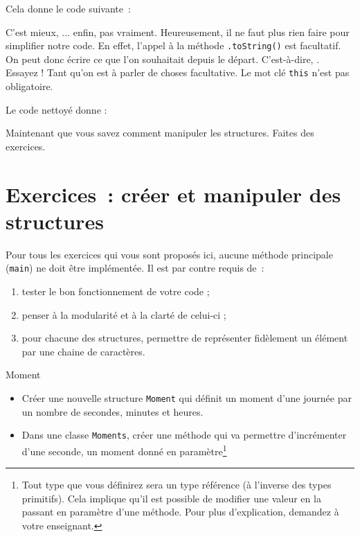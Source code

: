 \documentclass[a4paper,11pt]{article}
\begin{document}
	Cela donne le code suivante~:


	C'est mieux, ... enfin, pas vraiment. Heureusement, il ne faut plus rien faire pour simplifier notre code. En effet, l'appel à la méthode \texttt{.toString()} est facultatif. On peut donc écrire ce que l'on souhaitait depuis le départ. C'est-à-dire, . Essayez ! Tant qu'on est à parler de choses facultative. Le mot clé \texttt{this} n'est pas obligatoire.

	Le code nettoyé donne :

	Maintenant que vous savez comment manipuler les \og structures\fg. Faites des exercices.


	\bigskip

\section{Exercices~: créer et manipuler des structures}
	
	Pour tous les exercices qui vous sont proposés ici, aucune méthode principale (\texttt{main}) ne doit être implémentée. Il est par contre requis de~:
	\begin{enumerate}
		\item tester le bon fonctionnement de votre code ;
		\item penser à la modularité et à la clarté de celui-ci ;
		\item pour chacune des structures, permettre de représenter fidèlement un élément par une chaine de caractères.
	\end{enumerate}

	\begin{Exercice}{Moment}
		\begin{itemize}
			\item
				Créer une nouvelle structure \texttt{Moment} qui définit un moment d'une journée par un nombre de secondes, minutes et heures.
			\item 
				Dans une classe \texttt{Moments}, créer une méthode  qui va permettre d'incrémenter d'une seconde, un moment donné en paramètre\footnote{Tout type que vous définirez sera un type référence (à l'inverse des types primitifs). Cela implique qu'il est possible de modifier une valeur en la passant en paramètre d'une méthode. Pour plus d'explication, demandez à votre enseignant.}
		\end{itemize}		
	\end{Exercice}
\end{document}

